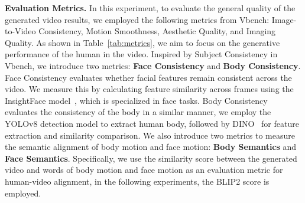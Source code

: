 \begin{table}[th!] 
  \centering
  \caption{Quantitative comparison between the baseline and the proposed extended diffusion transformer network further pretrained on the proposed 6.05K hours dataset. }
  \label{tab:action_compare}
\end{table}




\noindent\textbf{Evaluation Metrics.}
In this experiment, to evaluate the general quality of the generated video results, we employed the following metrics from Vbench: Image-to-Video Consistency, Motion Smoothness, Aesthetic Quality, and Imaging Quality. 
As shown in Table~\ref{tab:metrics}, we aim to focus on the generative performance of the human in the video. Inspired by Subject Consistency in Vbench, we introduce two metrics: \textbf{Face Consistency} and \textbf{Body Consistency}. Face Consistency evaluates whether facial features remain consistent across the video. We measure this by calculating feature similarity across frames using the InsightFace model~\cite{Deng2020CVPR}, which is specialized in face tasks. Body Consistency evaluates the consistency of the body in a similar manner, we employ the YOLOv8 detection model to extract human body, followed by DINO~\cite{caron2021emerging} for feature extraction and similarity comparison.
We also introduce two metrics to measure the semantic alignment of body motion and face motion: \textbf{Body Semantics} and \textbf{Face Semantics}. Specifically, we use the similarity score between the generated video and words of body motion and face motion as an evaluation metric for human-video alignment, in the following experiments, the BLIP2 score is employed.






